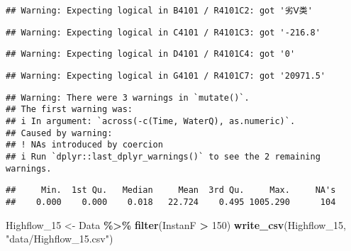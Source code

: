 \documentclass[
]{article}
\newenvironment{Shaded}{\begin{snugshade}}{\end{snugshade}}
\newcommand{\DecValTok}[1]{\textcolor[rgb]{0.00,0.00,0.81}{#1}}
\newcommand{\FunctionTok}[1]{\textcolor[rgb]{0.13,0.29,0.53}{\textbf{#1}}}
\newcommand{\NormalTok}[1]{#1}
\newcommand{\OtherTok}[1]{\textcolor[rgb]{0.56,0.35,0.01}{#1}}
\newcommand{\SpecialCharTok}[1]{\textcolor[rgb]{0.81,0.36,0.00}{\textbf{#1}}}
\newcommand{\StringTok}[1]{\textcolor[rgb]{0.31,0.60,0.02}{#1}}
\begin{document}
\begin{verbatim}
## Warning: Expecting logical in B4101 / R4101C2: got '劣Ⅴ类'
\end{verbatim}

\begin{verbatim}
## Warning: Expecting logical in C4101 / R4101C3: got '-216.8'
\end{verbatim}

\begin{verbatim}
## Warning: Expecting logical in D4101 / R4101C4: got '0'
\end{verbatim}

\begin{verbatim}
## Warning: Expecting logical in G4101 / R4101C7: got '20971.5'
\end{verbatim}

\begin{Shaded}
\end{Shaded}

\begin{verbatim}
## Warning: There were 3 warnings in `mutate()`.
## The first warning was:
## i In argument: `across(-c(Time, WaterQ), as.numeric)`.
## Caused by warning:
## ! NAs introduced by coercion
## i Run `dplyr::last_dplyr_warnings()` to see the 2 remaining warnings.
\end{verbatim}

\begin{Shaded}
\end{Shaded}

\begin{verbatim}
##     Min.  1st Qu.   Median     Mean  3rd Qu.     Max.     NA's 
##    0.000    0.000    0.018   22.724    0.495 1005.290      104
\end{verbatim}

\begin{Shaded}
\begin{Highlighting}[]
\NormalTok{Highflow\_15 }\OtherTok{\textless{}{-}}\NormalTok{ Data }\SpecialCharTok{\%\textgreater{}\%} \FunctionTok{filter}\NormalTok{(InstanF }\SpecialCharTok{\textgreater{}} \DecValTok{150}\NormalTok{)}
\FunctionTok{write\_csv}\NormalTok{(Highflow\_15, }\StringTok{"data/Highflow\_15.csv"}\NormalTok{)}
\end{Highlighting}
\end{Shaded}
\end{document}
